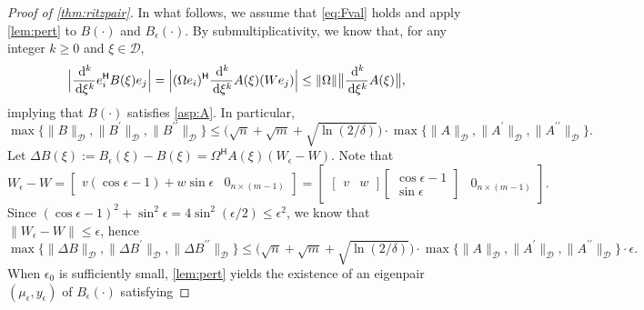\documentclass[a4paper,11pt]{article}
\newcommand{\Htran}{\mathsf{H}}
\newcommand{\de}{\,\mathrm{d}}
\newcommand{\defi}{:=}
\newcommand{\region}{\mathcal{D}}
\providecommand{\norm}[1]{\lVert#1\rVert}
\providecommand{\Bigabs}[1]{\Bigl\lvert#1\Bigr\rvert}
\providecommand{\bignorm}[1]{\bigl\lVert#1\bigr\rVert}
\begin{document}
\begin{proof}[Proof of \cref{thm:ritzpair}]
    In what follows, we assume that \cref{eq:Fval} holds and apply \cref{lem:pert} to $B(\cdot)$ and $B_{\epsilon}(\cdot)$.
    By submultiplicativity, we know that, for any integer $k\geq 0$ and $\xi\in\region$,
    \begin{equation*}
        \Bigabs{\frac{\de^{k}}{\de \xi^{k}} e_{i}^{\Htran}B(\xi)e_{j}} = \Bigabs{(\Omega e_{i})^{\Htran} \frac{\de^{k}}{\de \xi^{k}} A(\xi ) (We_{j})} \leq \norm{\Omega} \bignorm{ \frac{\de^{k}}{\de \xi^{k}} A(\xi )},
    \end{equation*}
    implying that $B(\cdot)$ satisfies \cref{asp:A}. In particular, 
    \begin{equation*}
        \max\bigl\{\norm{B}_{\region},\norm{B^{\prime}}_{\region},\norm{B^{\prime\prime}}_{\region}\bigr\}\leq \bigl(\sqrt{n}+\sqrt{m}+\sqrt{\ln(2/\delta)}\bigr)\cdot 
        \max\bigl\{\norm{A}_{\region},\norm{A^{\prime}}_{\region},\norm{A^{\prime\prime}}_{\region}\bigr\}.
    \end{equation*}
    Let $\Delta B(\xi) \defi B_{\epsilon}(\xi)-B(\xi) =\Omega^{\Htran}A(\xi)(W_{\epsilon}-W)$. Note that
    \begin{equation}
        \label{eq:WeW}
        W_{\epsilon}-W  = \begin{bmatrix}
            v(\cos\epsilon-1)+w\sin\epsilon & 0_{n\times (m-1)}
        \end{bmatrix}
        = \begin{bmatrix}
            \begin{bmatrix}
                v & w
            \end{bmatrix}
            \begin{bmatrix}
                \cos\epsilon-1\\ 
                \sin\epsilon
            \end{bmatrix}& 0_{n\times (m-1)}
        \end{bmatrix}.
    \end{equation}
    Since  $(\cos\epsilon-1)^{2}+\sin^{2}\epsilon=4\sin^{2}(\epsilon/2)\leq \epsilon^{2}$, we know that $\norm{W_{\epsilon}-W}\leq \epsilon$, hence
    \begin{equation*}
        \max\bigl\{\norm{\Delta B}_{\region},\norm{\Delta B^{\prime}}_{\region},\norm{\Delta B^{\prime\prime}}_{\region}\bigr\}\leq \bigl(\sqrt{n}+\sqrt{m}+\sqrt{\ln(2/\delta)}\bigr)\cdot 
        \max\bigl\{\norm{A}_{\region},\norm{A^{\prime}}_{\region},\norm{A^{\prime\prime}}_{\region}\bigr\}\cdot \epsilon.
    \end{equation*}
    When $\epsilon_{0}$ is sufficiently small, \cref{lem:pert} yields the existence of an eigenpair $(\mu_{\epsilon},y_{\epsilon})$ of $B_{\epsilon}(\cdot)$ satisfying

\end{proof}
\end{document}
